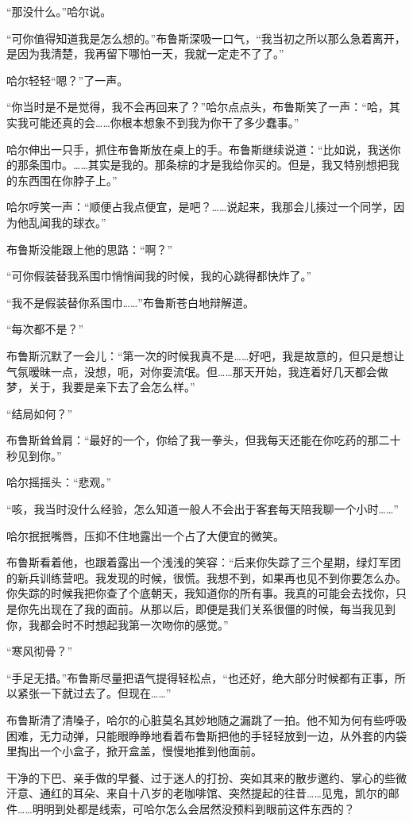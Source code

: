 \documentclass[../main]{subfiles}
\begin{document}
“那没什么。”哈尔说。

“可你值得知道我是怎么想的。”布鲁斯深吸一口气，“我当初之所以那么急着离开，是因为我清楚，我再留下哪怕一天，我就一定走不了了。”

哈尔轻轻“嗯？”了一声。

“你当时是不是觉得，我不会再回来了？”哈尔点点头，布鲁斯笑了一声：“哈，其实我可能还真的会……你根本想象不到我为你干了多少蠢事。”

哈尔伸出一只手，抓住布鲁斯放在桌上的手。布鲁斯继续说道：“比如说，我送你的那条围巾。……其实是我的。那条棕的才是我给你买的。但是，我又特别想把我的东西围在你脖子上。”

哈尔哼笑一声：“顺便占我点便宜，是吧？……说起来，我那会儿揍过一个同学，因为他乱闻我的球衣。”

布鲁斯没能跟上他的思路：“啊？”

“可你假装替我系围巾悄悄闻我的时候，我的心跳得都快炸了。”

“我不是假装替你系围巾\ldots\ldots”布鲁斯苍白地辩解道。

“每次都不是？”

布鲁斯沉默了一会儿：“第一次的时候我真不是……好吧，我是故意的，但只是想让气氛暧昧一点，没想，呃，对你耍流氓。但……那天开始，我连着好几天都会做梦，关于，我要是亲下去了会怎么样。”

“结局如何？”

布鲁斯耸耸肩：“最好的一个，你给了我一拳头，但我每天还能在你吃药的那二十秒见到你。”

哈尔摇摇头：“悲观。”

“咳，我当时没什么经验，怎么知道一般人不会出于客套每天陪我聊一个小时\ldots\ldots”

哈尔抿抿嘴唇，压抑不住地露出一个占了大便宜的微笑。

布鲁斯看着他，也跟着露出一个浅浅的笑容：“后来你失踪了三个星期，绿灯军团的新兵训练营吧。我发现的时候，很慌。我想不到，如果再也见不到你要怎么办。你失踪的时候我把你查了个底朝天，我知道你的所有事。我真的可能会去找你，只是你先出现在了我的面前。从那以后，即便是我们关系很僵的时候，每当我见到你，我都会时不时想起我第一次吻你的感觉。”

“寒风彻骨？”

“手足无措。”布鲁斯尽量把语气提得轻松点，“也还好，绝大部分时候都有正事，所以紧张一下就过去了。但现在\ldots\ldots”

布鲁斯清了清嗓子，哈尔的心脏莫名其妙地随之漏跳了一拍。他不知为何有些呼吸困难，无力动弹，只能眼睁睁地看着布鲁斯把他的手轻轻放到一边，从外套的内袋里掏出一个小盒子，掀开盒盖，慢慢地推到他面前。

干净的下巴、亲手做的早餐、过于迷人的打扮、突如其来的散步邀约、掌心的些微汗意、通红的耳朵、来自十八岁的老咖啡馆、突然提起的往昔……见鬼，凯尔的邮件……明明到处都是线索，可哈尔怎么会居然没预料到眼前这件东西的？
\end{document}
